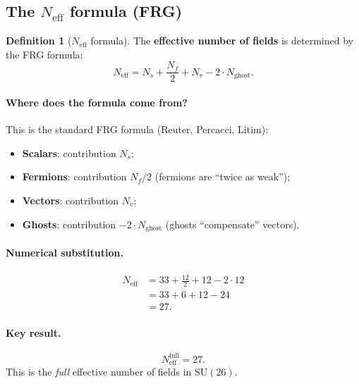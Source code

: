 \documentclass[11pt,a4paper]{article}
\newcommand{\SU}{\mathrm{SU}}
\newcommand{\Neff}{N_{\text{eff}}}
\theoremstyle{definition}
\newtheorem{definition}[theorem]{Definition}
\begin{document}
\subsection{The $\Neff$ formula (FRG)}
\label{subsec:neff-formula}

\begin{definition}[$\Neff$ formula]
\label{def:neff-formula}
The \textbf{effective number of fields} is determined by the FRG formula:
\begin{equation}
    \boxed{
    \Neff = N_s + \frac{N_f}{2} + N_v - 2 \cdot N_{\text{ghost}}.
    }
    \label{eq:neff-formula}
\end{equation}
\end{definition}

\paragraph{Where does the formula come from?}
This is the standard FRG formula (Reuter, Percacci, Litim):
\begin{itemize}
    \item \textbf{Scalars}: contribution $N_s$;
    \item \textbf{Fermions}: contribution $N_f / 2$ (fermions are ``twice as weak'');
    \item \textbf{Vectors}: contribution $N_v$;
    \item \textbf{Ghosts}: contribution $-2 \cdot N_{\text{ghost}}$ 
          (ghosts ``compensate'' vectors).
\end{itemize}

\paragraph{Numerical substitution.}
\begin{align}
    \Neff &= 33 + \frac{12}{2} + 12 - 2 \cdot 12 \\
          &= 33 + 6 + 12 - 24 \\
          &= 27.
\end{align}

\paragraph{Key result.}
\begin{equation}
    \boxed{
    \Neff^{\text{full}} = 27.
    }
\end{equation}
This is the \emph{full} effective number of fields in $\SU(26)$.
\end{document}
